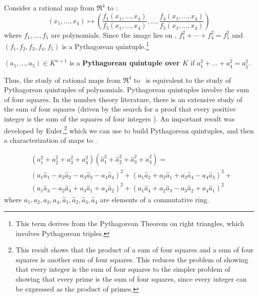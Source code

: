 Consider a rational map from $\Re^4$ to :
\[
	(x_1,\ldots,x_4) \mapsto
	(\frac{f_1(x_1,\ldots,x_4)}{f_{5}(x_1,\ldots,x_4)}, \ldots,
	 \frac{f_4(x_1,\ldots,x_4)}{f_{5}(x_1,\ldots,x_4)})
\]
where $f_1,\ldots,f_{5}$ are polynomials.
Since the image lies on , $f_1^2 + \cdots + f_4^2 = f_{5}^2$
and $(f_1,f_2,f_3,f_4,f_5)$ is a Pythagorean quintuple.\footnote{This term derives
	from the Pythagorean Theorem on right triangles,
	which involves Pythagorean triples.}
\begin{defn2}
$(a_1,\ldots,a_{5}) \in K^{n+1}$
is a {\bf Pythagorean quintuple over $K$} 
if $a_1^2 + \ldots + a_4^2 = a_5^2$.
\end{defn2}
%
Thus, the study of rational maps from $\Re^{4}$ to \ 
is equivalent to the study of Pythagorean quintuples of polynomials.
Pythagorean quintuples involve the sum of four squares.
In the number theory literature, there is an extensive study of the
sum of four squares (driven by the search for a proof that
every positive integer is the sum of the squares of four integers \cite{dickson52}).
An important result was developed by Euler,\footnote{This result shows that the product of a sum of four squares and a sum of four
	squares is another sum of four squares.
	This reduces the problem of showing that every integer is the sum
	of four squares to the simpler problem
	of showing that every prime is the sum of four squares,
	since every integer can be expressed as the product of primes.}
which we can use to build Pythagorean quintuples, 
and then a characterization of maps to .

\begin{lemma}
\label{lem:euler}
\[
\begin{array}{ll}
& (a_1^2 + a_2^2 + a_3^2 + a_4^2) 
(\hat{a}^2_1 + \hat{a}^2_2 + \hat{a}^2_3 + \hat{a}^2_4) = \\
& (a_1 \hat{a}_1 - a_2\hat{a}_2 - a_3\hat{a}_3 - a_4\hat{a}_4)^2 +
   (a_1\hat{a}_2 + a_2\hat{a}_1 + a_3\hat{a}_4 - a_4\hat{a}_3)^2 + \\
& (a_1\hat{a}_3 - a_2\hat{a}_4 + a_3\hat{a}_1 + a_4\hat{a}_2)^2 +
   (a_1\hat{a}_4 + a_2\hat{a}_3 - a_3\hat{a}_2 + a_4\hat{a}_1)^2
\end{array}
\]
where $a_1,a_2,a_3,a_4,\hat{a}_1,\hat{a}_2,\hat{a}_3,\hat{a}_4$ are elements of a
commutative ring.
\end{lemma}

